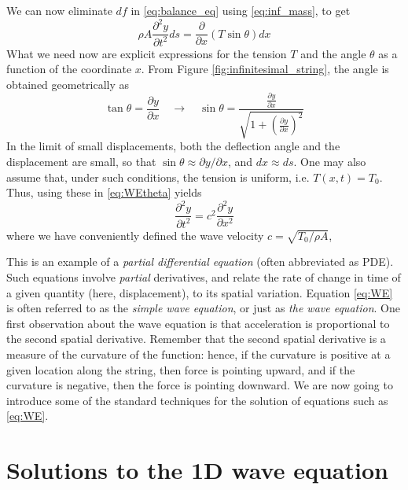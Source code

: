 We can now eliminate $df$ in  \eqref{eq:balance_eq} using \eqref{eq:inf_mass}, to get
\begin{equation}\label{eq:WEtheta}
\rho A \frac{\partial^2 y}{\partial t^2}ds = \frac{\partial}{\partial x}(T \sin\theta)dx
\end{equation}
What we need now are explicit expressions for the tension $T$ and the angle $\theta$ as a function of the  coordinate $x$. From Figure \ref{fig:infinitesimal_string}, the angle is obtained geometrically as
\begin{equation}
\tan\theta = \frac{\partial y}{\partial x} \quad \rightarrow \quad \sin\theta = \frac{\frac{\partial y}{\partial x}}{\sqrt{1 + (\frac{\partial y}{\partial x})^2}} 
\end{equation}
In the limit of small displacements, both the deflection angle and the displacement are small, so that $\sin \theta  \approx \partial y / \partial x$, and $dx \approx ds$. One may also assume that, under such conditions, the tension is uniform, i.e. $T(x,t)=T_0$. Thus, using these in \eqref{eq:WEtheta} yields
\begin{equation}\label{eq:WE}
 \frac{\partial^2 y}{\partial t^2} = c^2 \frac{\partial^2 y}{\partial x^2}
\end{equation}
where we have conveniently defined the wave velocity $c = \sqrt{T_0 /\rho A}$,





This is an example of a \emph{partial differential equation} (often abbreviated as PDE). Such equations involve \emph{partial} derivatives, and relate the rate of change in time of a given quantity (here, displacement), to its spatial variation. Equation \eqref{eq:WE} is often referred to as the \emph{simple wave equation}, or just as \emph{the wave equation}.
One first observation about the wave equation is that acceleration is proportional to the second spatial derivative. Remember that the second spatial derivative is a measure of the curvature of the function: hence, if the curvature is positive at a given location along the string, then force is pointing upward, and if the curvature is negative, then the force is pointing downward.  We are now going to introduce some of the standard techniques for the solution of equations such as \eqref{eq:WE}. 




\section{Solutions to the 1D wave equation}

